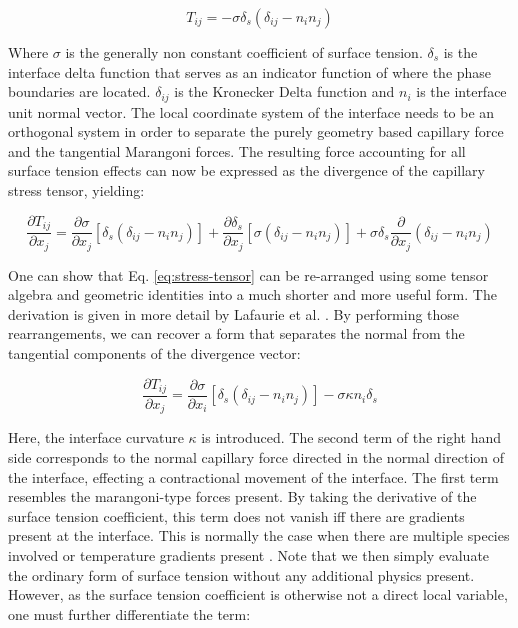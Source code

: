 \documentclass[conference,final]{IEEEtran}
\begin{document}
\begin{equation}
    T_{ij} = - \sigma \delta_s (\delta_{ij} - n_i n_j)
\end{equation}

Where $\sigma$ is the generally non constant coefficient of surface tension. $\delta_s$ is the interface delta function that serves as an indicator function of where the phase boundaries are located. $\delta_{ij}$ is the Kronecker Delta function and $n_i$ is the interface unit normal vector. The local coordinate system of the interface needs to be an orthogonal system in order to separate the purely geometry based capillary force and the tangential Marangoni forces.
The resulting force accounting for all surface tension effects can now be expressed as the divergence of the capillary stress tensor, yielding:

\begin{equation}
    \frac{\partial T_{ij}}{\partial x_j} = \frac{\partial \sigma}{\partial x_j} [\delta_s(\delta_{ij} - n_i n_j)] + \frac{\partial \delta_s}{\partial x_j} [\sigma (\delta_{ij} - n_i n_j)] + \sigma \delta_s \frac{\partial}{\partial x_j} (\delta_{ij} - n_i n_j) \label{eq:stress-tensor}
\end{equation}

One can show that Eq. \ref{eq:stress-tensor} can be re-arranged using some tensor algebra and geometric identities into a much shorter and more useful form. The derivation is given in more detail by Lafaurie et al. \cite{lafaurieModellingMergingFragmentation1994}. By performing those rearrangements, we can recover a form that separates the normal from the tangential components of the divergence vector:

\begin{equation}
\label{eq:divergence-capillarystress}
    \frac{\partial T_{ij}}{\partial x_j} = \frac{\partial \sigma}{\partial x_i} [\delta_s(\delta_{ij} - n_i n_j)] - \sigma \kappa n_i \delta_s 
\end{equation}

Here, the interface curvature $\kappa$ is introduced. The second term of the right hand side corresponds to the normal capillary force directed in the normal direction of the interface, effecting a contractional movement of the interface. The first term resembles the marangoni-type forces present. By taking the derivative of the surface tension coefficient, this term does not vanish iff there are gradients present at the interface. This is normally the case when there are multiple species involved or temperature gradients present \cite{j.straubThermokapillareGrenzflachenkonvektionGasblasen1990}. Note that we then simply evaluate the ordinary form of surface tension without any additional physics present. However, as the surface tension coefficient is otherwise not a direct local variable, one must further differentiate the term:
\end{document}
